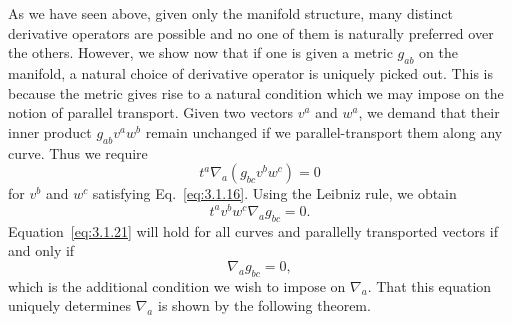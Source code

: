 As we have seen above, given only the manifold structure, many distinct derivative operators are possible and no one of them is naturally preferred over the others.
However, we show now that if one is given a metric $g_{ab}$ on the manifold, a natural
choice of derivative operator is uniquely picked out. This is because the metric gives
rise to a natural condition which we may impose on the notion of parallel transport.
Given two vectors $v^a$ and $w^a$, we demand that their inner product $g_{ab}v^aw^b$ remain
unchanged if we parallel-transport them along any curve. Thus we require
\begin{equation}
  t^a\nabla_a(g_{bc}v^bw^c)=0
  \tag{3.1.20}\label{eq:3.1.20}
\end{equation}
for $v^b$ and $w^c$ satisfying Eq.~\eqref{eq:3.1.16}. Using the Leibniz rule, we obtain
\begin{equation}
  t^av^bw^c\nabla_ag_{bc}=0.
  \tag{3.1.21}\label{eq:3.1.21}
\end{equation}
Equation~\eqref{eq:3.1.21} will hold for all curves and parallelly transported vectors if and
only if
\begin{equation}
  \nabla_ag_{bc}=0,
  \tag{3.1.22}\label{eq:3.1.22}
\end{equation}
which is the additional condition we wish to impose on $\nabla_a$. That this equation
uniquely determines $\nabla_a$ is shown by the following theorem.

